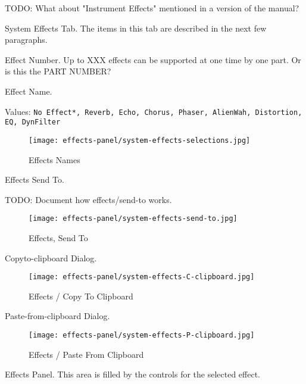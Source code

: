    TODO: What about "Instrument Effects" mentioned in a version of the
   manual?

   \setcounter{ItemCounter}{0}      %

   System Effects Tab.
   The items in this tab are described in the next few paragraphs.

   Effect Number.
   Up to XXX effects can be supported at one time by one part.
   Or is this the PART NUMBER?

   Effect Name.

   Values: \texttt{No Effect*, Reverb, Echo, Chorus, Phaser, AlienWah,
      Distortion, EQ, DynFilter}

\begin{figure}[H]
   \centering 
   \texttt{[image: effects-panel/system-effects-selections.jpg]}
   \caption{Effects Names}
   \label{fig:effects_names}
\end{figure}

   Effects Send To.

   TODO:  Document how effects/send-to works.

\begin{figure}[H]
   \centering 
   \texttt{[image: effects-panel/system-effects-send-to.jpg]}
   \caption{Effects, Send To}
   \label{fig:effects_send_to}
\end{figure}

   Copyto-clipboard Dialog.

\begin{figure}[H]
   \centering 
   \texttt{[image: effects-panel/system-effects-C-clipboard.jpg]}
   \caption{Effects / Copy To Clipboard}
   \label{fig:effects_copy_to_clipboard}
\end{figure}

   Paste-from-clipboard Dialog.

\begin{figure}[H]
   \centering 
   \texttt{[image: effects-panel/system-effects-P-clipboard.jpg]}
   \caption{Effects / Paste From Clipboard}
   \label{fig:effects_paste_from_clipboard}
\end{figure}

   Effects Panel.
   This area is filled by the controls for the selected effect.

